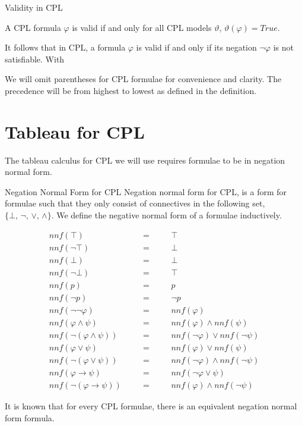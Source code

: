 \documentclass{llncs}
\newcommand{\nnf}{{nnf}}
\begin{document}
\begin{definition}{Validity in CPL}\label{Validity in CPL}

A CPL formula $\varphi$ is valid if and only for all CPL models
$\vartheta$, $\vartheta(\varphi) = True$.

It follows that in CPL, a formula $\varphi$ is valid if and only if its negation
$\neg \varphi$ is not satisfiable. With
\end{definition}

We will omit parentheses for CPL formulae for convenience and clarity. The
precedence will be from highest to lowest as defined in the definition.

\section{Tableau for CPL}\label{Tableau for CPL}

The tableau calculus for CPL we will use requires formulae to be in negation
normal form.

\begin{definition}{Negation Normal Form for CPL}\label{NNF for CPL}
Negation normal form for CPL, is a form for formulae such that they only
consist of connectives in the following set, $\{\bot, \, \neg, \, \vee,\,
\wedge\}$. We define the negative normal form of a formulae inductively.

$$
\begin{array}{rlcll}
\nnf(\top)&\quad&=&\quad&\top \\
\nnf(\neg\top)&&=&&\bot \\
\nnf(\bot)&\quad&=&\quad&\bot \\
\nnf(\neg\bot)&&=&&\top \\
\nnf(p)&&=&&p \\
\nnf(\neg p)&&=&&\neg p \\
\nnf(\neg\neg\varphi)&&=&&\nnf(\varphi) \\
\nnf(\varphi \wedge \psi)&&=&&\nnf(\varphi) \wedge \nnf(\psi) \\
\nnf(\neg(\varphi \wedge \psi))&&=&&\nnf(\neg\varphi) \vee \nnf(\neg\psi) \\
\nnf(\varphi \vee \psi)&&=&&\nnf(\varphi) \vee \nnf(\psi) \\
\nnf(\neg(\varphi \vee \psi))&&=&&\nnf(\neg\varphi) \wedge \nnf(\neg\psi) \\
\nnf(\varphi \rightarrow \psi)&&=&&\nnf(\neg\varphi \vee \psi) \\
\nnf(\neg(\varphi \rightarrow \psi))&&=&&\nnf(\varphi) \wedge \nnf(\neg\psi)
\end{array}
$$

It is known that for every CPL formulae, there is an equivalent negation normal
form formula.
\end{definition}
\end{document}
